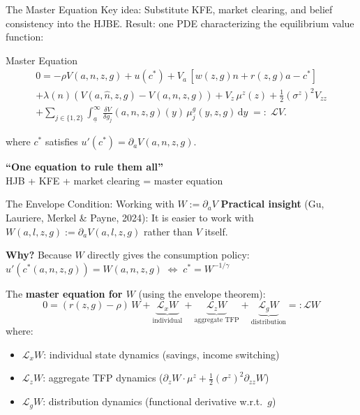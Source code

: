 \documentclass[aspectratio=169,11pt]{beamer}
\newcommand{\emphc}[1]{\textcolor{harvardcrimson}{#1}}
\newcommand{\ud}{\,\mathrm{d}}
\newcommand{\ubar}[1]{\underline{#1}}
\begin{document}
\begin{frame}{The Master Equation}
\footnotesize
\emphc{Key idea}: Substitute KFE, market clearing, and belief consistency \emphc{into} the HJBE.
Result: \emphc{one PDE} characterizing the equilibrium value function:

\vspace{0.1em}
\begin{block}{Master Equation}
\footnotesize
\vspace{-0.2em}
\begin{multline*}
0 = -\rho V(a,n,z,g) + u(c^*) + V_a\,[w(z,g)n+r(z,g)a-c^*] \\
+ \lambda(n)\!\left(V(a,\hat n,z,g)-V(a,n,z,g)\right)
+ V_z\,\mu^z(z) + \tfrac12(\sigma^z)^2V_{zz} \\
+ \sum_{j\in\{1,2\}}\int_{\ubar a}^{\infty}
\frac{\delta V}{\delta g_j}(a,n,z,g)(y)\,\mu^g_j(y,z,g)\ud y
\;=:\;\mathcal{L}V.
\end{multline*}
\vspace{-0.2em}
\end{block}

where $c^*$ satisfies $u'(c^*) = \partial_a V(a,n,z,g)$.

\vspace{0.2em}
\begin{center}
\colorbox{uzhgreylight}{\parbox{0.6\textwidth}{\centering\small
\textbf{``One equation to rule them all''}\\
HJB + KFE + market clearing = master equation}}
\end{center}
\end{frame}

\begin{frame}{The Envelope Condition: Working with $W := \partial_a V$}
\small
\textbf{Practical insight} (Gu, Lauriere, Merkel \& Payne, 2024):
It is easier to work with $W(a,l,z,g) := \partial_a V(a,l,z,g)$ rather than $V$ itself.

\textbf{Why?} Because $W$ \emphc{directly gives the consumption policy}:
$u'(c^*(a,n,z,g)) = W(a,n,z,g) \;\Leftrightarrow\; c^* = W^{-1/\gamma}$

The \textbf{master equation for $W$} (using the envelope theorem):
\[
\boxed{0 = (r(z,g) - \rho)\,W + \underbrace{\mathcal{L}_x W}_{\text{individual}} + \underbrace{\mathcal{L}_z W}_{\text{aggregate TFP}} + \underbrace{\mathcal{L}_g W}_{\text{distribution}} =: \mathcal{L}W}
\]
where:
\begin{itemize}\itemsep2pt
    \item $\mathcal{L}_x W$: individual state dynamics (savings, income switching)
    \item $\mathcal{L}_z W$: aggregate TFP dynamics ($\partial_z W \cdot \mu^z + \frac{1}{2}(\sigma^z)^2\partial_{zz}W$)
    \item $\mathcal{L}_g W$: distribution dynamics (functional derivative w.r.t.\ $g$)
\end{itemize}
\end{frame}
\end{document}
